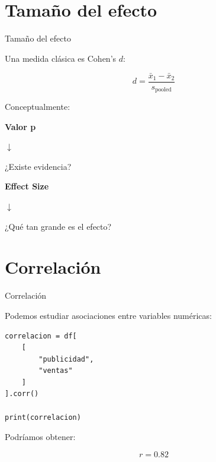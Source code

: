 \documentclass[aspectratio=169,11pt]{beamer}
\begin{document}
\section{Tamaño del efecto}

\begin{frame}{Tamaño del efecto}

Una medida clásica es Cohen's $d$:

\[
d
=
\frac{
\bar{x}_1
-
\bar{x}_2
}{
s_{\text{pooled}}
}
\]

\vspace{0.5cm}

Conceptualmente:

\begin{center}

\textbf{Valor p}

$\downarrow$

¿Existe evidencia?

\vspace{0.5cm}

\textbf{Effect Size}

$\downarrow$

¿Qué tan grande es el efecto?

\end{center}

\end{frame}

\section{Correlación}

\begin{frame}[fragile]{Correlación}

Podemos estudiar asociaciones entre variables numéricas:

\begin{lstlisting}
correlacion = df[
    [
        "publicidad",
        "ventas"
    ]
].corr()

print(correlacion)
\end{lstlisting}

Podríamos obtener:

\[
r
=
0.82
\]

\end{frame}
\end{document}
